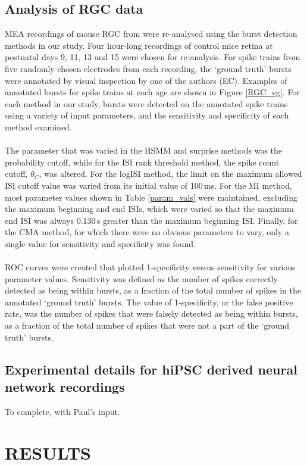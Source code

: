 \documentclass[12pt, titlepage]{article}
\begin{document}
	\subsection*{Analysis of RGC data}
	MEA recordings of mouse RGC from \cite{Demas2003} were re-analysed using the burst detection methods in our study. Four hour-long recordings of  control mice retina at postnatal days 9, 11, 13 and 15 were chosen for re-analysis. For spike trains from five randomly chosen electrodes from each recording, the `ground truth' bursts were annotated by visual inspection by one of the authors (EC). Examples of annotated bursts for spike trains at each age are shown in Figure \ref{RGC_eg}. For each method in our study, bursts were detected on the annotated spike trains using a variety of input parameters, and the sensitivity and specificity of each method examined.
	\\ \\The parameter that was varied in the HSMM and surprise methods was the probability cutoff, while for the ISI rank threshold method, the spike count cutoff, $\theta_C$, was altered. For the logISI method, the limit on the maximum allowed ISI cutoff value was varied from its initial value of 100$\,$ms. For the MI method, most parameter values shown in Table \ref{param_vals} were maintained, excluding the maximum beginning and end ISIs, which were varied so that the maximum end ISI was always 0.130$\,$s greater than the maximum beginning ISI. Finally, for the CMA method, for which there were no obvious parameters to vary, only a single value for sensitivity and specificity was found.
	\\ \\ ROC curves were created that plotted 1-specificity versus sensitivity for various parameter values. Sensitivity was defined as the number of spikes correctly detected as being within bursts, as a fraction of the total number of spikes in the annotated `ground truth' bursts. The value of 1-specificity, or the false positive rate, was the number of spikes that were falsely detected as being within bursts, as a fraction of the total number of spikes that were not a part of the `ground truth' bursts.
	\subsection*{Experimental details for hiPSC derived neural network recordings}
	To complete, with Paul's input.
	\section*{RESULTS}
\end{document}
